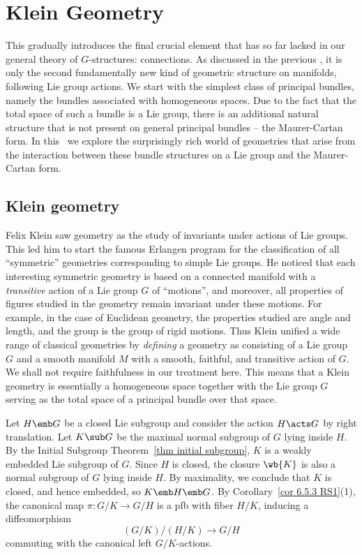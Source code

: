 \chapter{Klein Geometry}\label{chap: Klein geom}

This \partt{} gradually introduces the final crucial element that has so far lacked in our general theory of $G$-structures: connections. As discussed in the previous \chap, it is only the second fundamentally new kind of geometric structure on manifolds, following Lie group actions. We start with the simplest class of principal bundles, namely the bundles associated with homogeneous spaces. Due to the fact that the total space of such a bundle is a Lie group, there is an additional natural structure that is not present on general principal bundles -- the Maurer-Cartan form. In this \chap\ we explore the surprisingly rich world of geometries that arise from the interaction between these bundle structures on a Lie group and the Maurer-Cartan form.



\section{Klein geometry}

\begin{intu*}
    Felix Klein saw geometry as the study of invariants under actions of Lie groups. This led him to start the famous Erlangen program for the classification of all ``symmetric'' geometries corresponding to simple Lie groups. He noticed that each interesting symmetric geometry is based on a connected manifold with a \emph{transitive} action of a Lie group $G$ of ``motions'', and moreover, all properties of figures studied in the geometry remain invariant under these motions. For example, in the case of Euclidean geometry, the properties studied are angle and length, and the group is the group of rigid motions. Thus Klein unified a wide range of classical geometries by \emph{defining} a geometry as consisting of a Lie group $G$ and a smooth manifold $M$ with a smooth, faithful, and transitive action of $G$. We shall not require faithfulness in our treatment here. This means that a Klein geometry is essentially a homogeneous space together with the Lie group $G$ serving as the total space of a principal bundle over that space.
\end{intu*}

Let $H\emb G$ be a closed Lie subgroup and consider the action $H\acts G$ by right translation. Let $K\sub G$ be the maximal normal subgroup of $G$ lying inside $H$. By the Initial Subgroup Theorem~\ref{thm initial subgroup}, $K$ is a weakly embedded Lie subgroup of $G$. Since $H$ is closed, the closure $\wb{K}$ is also a normal subgroup of $G$ lying inside $H$. By maximality, we conclude that $K$ is closed, and hence embedded, so $K\emb H\emb G$. By Corollary~\ref{cor 6.5.3 RS1}(1), the canonical map $\pi:G\slash K\to G\slash H$ is a \gls{pfb} with fiber $H\slash K$, inducing a diffeomorphism
\[(G\slash K)\slash (H\slash K)\to G\slash H\]
commuting with the canonical left $G\slash K$-actions.

